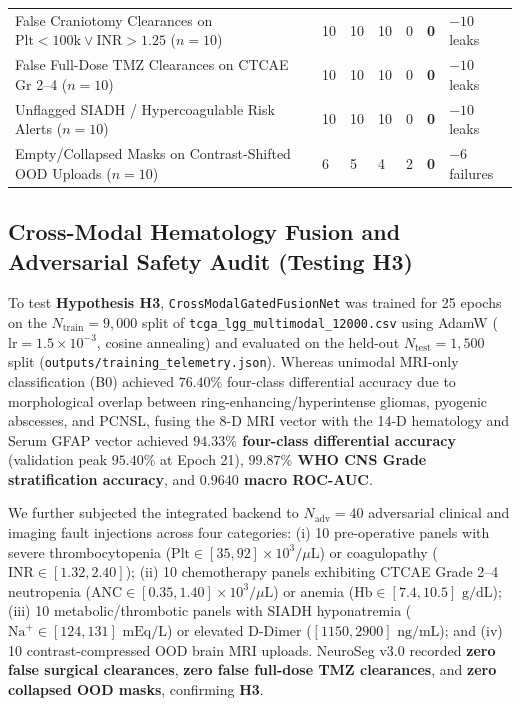 \documentclass[conference]{IEEEtran}
\begin{document}
\begin{table}[t]
\begin{tabular}{@{}L{4.85cm}R{1.45cm}R{1.45cm}R{1.45cm}R{1.45cm}R{1.65cm}R{1.65cm}@{}}
False Craniotomy Clearances on $\text{Plt}<100\text{k} \lor \text{INR}>1.25$ ($n=10$) & 10 & 10 & 10 & 0 & \textbf{0} & $-10$ leaks \\
False Full-Dose TMZ Clearances on CTCAE Gr 2--4 ($n=10$) & 10 & 10 & 10 & 0 & \textbf{0} & $-10$ leaks \\
Unflagged SIADH / Hypercoagulable Risk Alerts ($n=10$) & 10 & 10 & 10 & 0 & \textbf{0} & $-10$ leaks \\
Empty/Collapsed Masks on Contrast-Shifted OOD Uploads ($n=10$) & 6 & 5 & 4 & 2 & \textbf{0} & $-6$ failures \\
\bottomrule
\end{tabular}
\end{table}

\subsection{Cross-Modal Hematology Fusion and Adversarial Safety Audit (Testing H3)}
To test \textbf{Hypothesis H3}, \texttt{CrossModalGatedFusionNet} was trained for 25 epochs on the $N_{\text{train}} = 9,000$ split of \texttt{tcga\_lgg\_multimodal\_12000.csv} using AdamW ($\text{lr} = 1.5\times 10^{-3}$, cosine annealing) and evaluated on the held-out $N_{\text{test}} = 1,500$ split (\texttt{outputs/training\_telemetry.json}). Whereas unimodal MRI-only classification (B0) achieved $76.40\%$ four-class differential accuracy due to morphological overlap between ring-enhancing/hyperintense gliomas, pyogenic abscesses, and PCNSL, fusing the 8-D MRI vector with the 14-D hematology and Serum GFAP vector achieved \textbf{$94.33\%$ four-class differential accuracy} (validation peak $95.40\%$ at Epoch 21), \textbf{$99.87\%$ WHO CNS Grade stratification accuracy}, and \textbf{$0.9640$ macro ROC-AUC}.

We further subjected the integrated backend to $N_{\text{adv}} = 40$ adversarial clinical and imaging fault injections across four categories: (i) 10 pre-operative panels with severe thrombocytopenia ($\text{Plt} \in [35, 92] \times 10^3/\mu\text{L}$) or coagulopathy ($\text{INR} \in [1.32, 2.40]$); (ii) 10 chemotherapy panels exhibiting CTCAE Grade 2--4 neutropenia ($\text{ANC} \in [0.35, 1.40] \times 10^3/\mu\text{L}$) or anemia ($\text{Hb} \in [7.4, 10.5]\text{ g/dL}$); (iii) 10 metabolic/thrombotic panels with SIADH hyponatremia ($\text{Na}^+ \in [124, 131]\text{ mEq/L}$) or elevated D-Dimer ($[1150, 2900]\text{ ng/mL}$); and (iv) 10 contrast-compressed OOD brain MRI uploads. NeuroSeg v3.0 recorded \textbf{zero false surgical clearances}, \textbf{zero false full-dose TMZ clearances}, and \textbf{zero collapsed OOD masks}, confirming \textbf{H3}.
\end{document}
